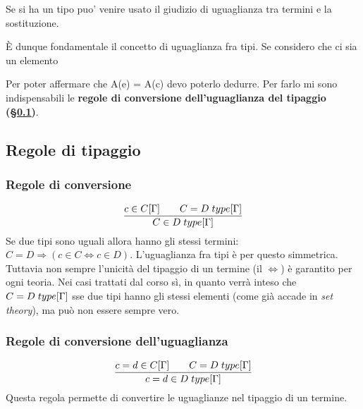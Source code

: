 \documentclass[10pt,a4paper, italian]{book}
\begin{document}
\begin{prooftree}
\end{prooftree}
Se si ha un tipo puo' venire usato il giudizio di uguaglianza tra termini e la sostituzione.
\begin{prooftree}
\end{prooftree}
\noindent
\`E dunque fondamentale il concetto di uguaglianza fra tipi. Se considero che ci sia un elemento

\begin{prooftree}
\end{prooftree}
\noindent
Per poter affermare che A(e) = A(c) devo poterlo dedurre. Per farlo mi sono indispensabili le \textbf{regole di conversione dell'uguaglianza del tipaggio (\S\ref{subsec:regole-tipaggio})}.

\subsection{Regole di tipaggio}
\label{subsec:regole-tipaggio}

\subsubsection{Regole di conversione}
\label{subsubsec:regole-di-conversione}
\[\frac{c \in C[\Gamma] \qquad C = D\hspace{0.1cm}type[\Gamma]}{C \in D\hspace{0.1cm}type [\Gamma]}\]
Se due tipi sono uguali allora hanno gli stessi termini: $C=D \Rightarrow (c \in C \Leftrightarrow c \in D)$. L'uguaglianza fra tipi \`e per questo simmetrica.\\
Tuttavia non sempre l'unicit\`a del tipaggio di un termine (il $\Leftrightarrow$) \`e garantito per ogni teoria. Nei casi trattati dal corso s\`i, in quanto verr\`a inteso che $C = D\hspace{0.1cm}type[\Gamma]$ sse due tipi hanno gli stessi elementi (come gi\`a accade in \textit{set theory}), ma pu\`o non essere sempre vero.

\subsubsection{Regole di conversione dell'uguaglianza}
\label{subsubsec:regole-di-conversione-uguaglianza}
\[\frac{c=d \in C[\Gamma] \qquad C = D\hspace{0.1cm}type[\Gamma]}{c = d \in D \hspace{0.1cm} type [\Gamma]}\]
Questa regola permette di convertire le uguaglianze nel tipaggio di un termine.
\end{document}
